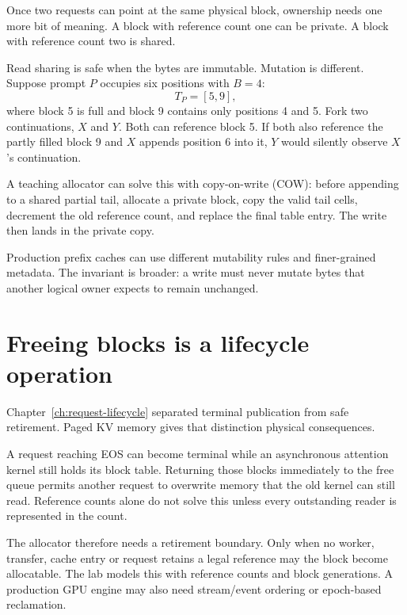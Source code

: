Once two requests can point at the same physical block, ownership needs one
more bit of meaning. A block with reference count one can be private. A block
with reference count two is shared.

Read sharing is safe when the bytes are immutable. Mutation is different.
Suppose prompt $P$ occupies six positions with $B=4$:
\[
T_P=[5,9],
\]
where block 5 is full and block 9 contains only positions 4 and 5. Fork two
continuations, $X$ and $Y$. Both can reference block 5. If both also reference
the partly filled block 9 and $X$ appends position 6 into it, $Y$ would
silently observe $X$'s continuation.

A teaching allocator can solve this with copy-on-write (COW): before appending
to a shared partial tail, allocate a private block, copy the valid tail cells,
decrement the old reference count, and replace the final table entry. The
write then lands in the private copy.


Production prefix caches can use different mutability rules and finer-grained
metadata. The invariant is broader: a write must never mutate bytes that
another logical owner expects to remain unchanged.

\section{Freeing blocks is a lifecycle operation}

Chapter~\ref{ch:request-lifecycle} separated terminal publication from safe
retirement. Paged KV memory gives that distinction physical consequences.

A request reaching EOS can become terminal while an asynchronous attention
kernel still holds its block table. Returning those blocks immediately to the
free queue permits another request to overwrite memory that the old kernel can
still read. Reference counts alone do not solve this unless every outstanding
reader is represented in the count.

The allocator therefore needs a retirement boundary. Only when no worker,
transfer, cache entry or request retains a legal reference may the block
become allocatable. The lab models this with reference counts and block
generations. A production GPU engine may also need stream/event ordering or
epoch-based reclamation.

